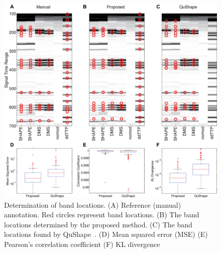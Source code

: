 \begin{figure}
\centering
\includegraphics[width=0.9\linewidth]{figures/result_band_assign4}
\caption{Determination of band locations. (A) Reference (manual) annotation. Red circles represent band locations. (B) The band locations determined by the proposed method. (C) The band locations found by QuShape~\citep{Karabiber2013}. (D) Mean squared error (MSE) (E) Pearson's correlation coefficient (F) KL divergence}
\label{f:band-assign}
\end{figure}

